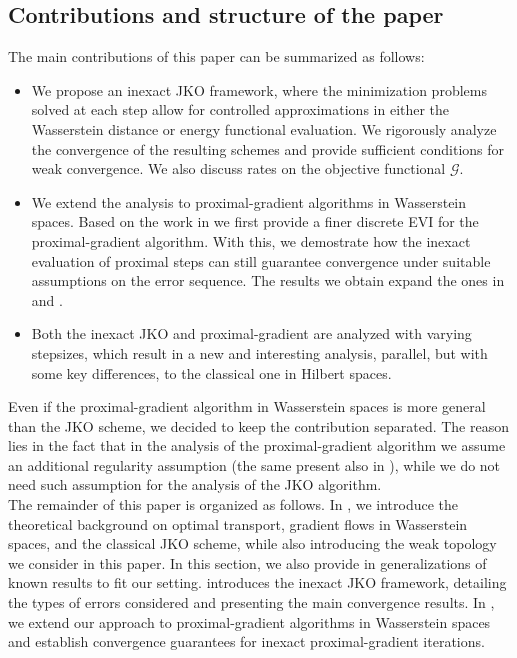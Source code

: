\documentclass[11pt]{article}
\newcommand{\cG}{\mathcal{G}}
\numberwithin{equation}{section}
\begin{document}
\subsection{Contributions and structure of the paper} 
The main contributions of this paper can be summarized as follows:
\begin{itemize}
	\item We propose an inexact JKO framework, where the minimization problems solved at each step allow for controlled approximations in either the Wasserstein distance or energy functional evaluation. We rigorously analyze the convergence of the resulting schemes and provide sufficient conditions for weak convergence. We also discuss rates on the objective functional $\cG$.
	\item We extend the analysis to proximal-gradient algorithms in Wasserstein spaces. Based on the work in \cite{WPG2020} we first provide a finer discrete EVI for the proximal-gradient algorithm. With this, we demostrate how the inexact evaluation of proximal steps can still guarantee convergence under suitable assumptions on the error sequence. The results we obtain expand the ones in \cite{WPG2020} and \cite[Theorem 5.3]{diao2023}.
	\item Both the inexact JKO and proximal-gradient are analyzed with varying stepsizes, which result in a new and interesting analysis, parallel, but with some key differences, to the classical one in Hilbert spaces.
\end{itemize}
Even if the proximal-gradient algorithm in Wasserstein spaces is more general than the JKO scheme, we decided to keep the contribution separated. The reason lies in the fact that in the analysis of the proximal-gradient algorithm we assume an additional regularity assumption (the same present also in \cite{WPG2020}), while we do not need such assumption for the analysis of the JKO algorithm.\\

The remainder of this paper is organized as follows. In , we introduce the theoretical background on optimal transport, gradient flows in Wasserstein spaces, and the classical JKO scheme, while also introducing the weak topology we consider in this paper. In this section, we also provide in  generalizations of known results to fit our setting.  introduces the inexact JKO framework, detailing the types of errors considered and presenting the main convergence results. In , we extend our approach to proximal-gradient algorithms in Wasserstein spaces and establish convergence guarantees for inexact proximal-gradient iterations.
\end{document}

